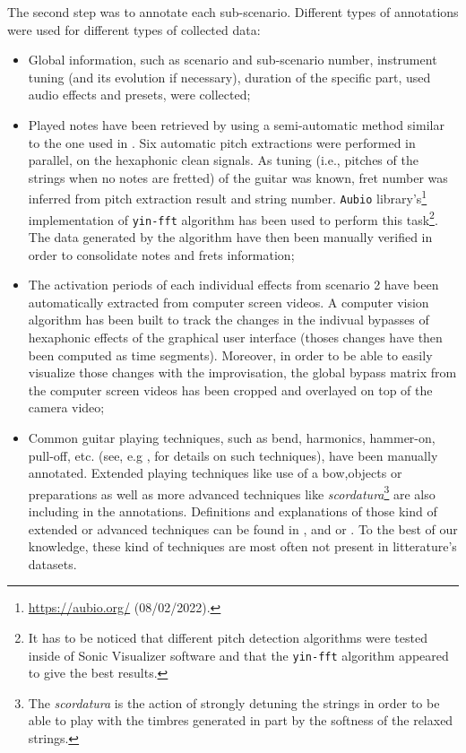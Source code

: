 \documentclass{article}
\begin{document}
The second step was to annotate each sub-scenario. Different types of annotations were used for different types of collected data: 
\begin{itemize}
\item Global information, such as scenario and sub-scenario number, instrument tuning (and its evolution if necessary), duration of the specific part, used audio effects and presets, were collected;

\item Played notes have been retrieved by using a semi-automatic method similar to the one used in \cite{sci:Xi2018}. Six automatic pitch extractions were performed in parallel, on the hexaphonic clean signals. As tuning (i.e., pitches of the strings when no notes are fretted) of the guitar was known, fret number was inferred from pitch extraction result and string number.  \texttt{Aubio} library's\footnote{\url{https://aubio.org/} (08/02/2022).} implementation of \texttt{yin-fft} algorithm \cite{sci:Brossier_yinFFT} has been used to perform this task\footnote{It has to be noticed that different pitch detection algorithms were tested inside of Sonic Visualizer software and that the \texttt{yin-fft} algorithm appeared to give the best results. }. The data generated by the algorithm have then been manually verified in order to consolidate notes and frets information; 

\item The activation periods of each individual effects from scenario 2 have been automatically extracted from computer screen videos. A computer vision algorithm has been built to track the changes in the indivual bypasses of hexaphonic effects of the graphical user interface (thoses changes have then been computed as time segments). Moreover, in order to be able to easily visualize those changes with the improvisation, the global bypass matrix from the computer screen videos has been cropped and overlayed on top of the camera video; %

\item Common guitar playing techniques, such as bend, harmonics, hammer-on, pull-off, etc. (see, e.g \cite{sci:Su2014a}, for details on such techniques), have been manually annotated. Extended playing techniques like use of a bow,objects or preparations as well as more advanced techniques like \textit{scordatura}\footnote{The \textit{scordatura} is the action of strongly detuning the strings in order to be able to play with
the timbres generated in part by the softness of the relaxed strings.} are also including in the annotations. Definitions and explanations of those kind of extended or advanced techniques can be found in \cite{Josel2014},  \cite{organo:schndeider2015_microtones} and \cite{organo:Landman2012} or \cite{organo:ElgartYates1990}. To the best of our knowledge, these kind of techniques are most often not present in litterature's datasets.
\end{itemize}
\end{document}
